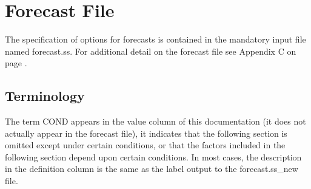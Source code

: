 \section{Forecast File}
The specification of options for forecasts is contained in the mandatory input file named forecast.ss.  For additional detail on the forecast file see Appendix C on page \pageref{sec:forecast}.


\subsection{Terminology}
The term COND appears in the value column of this documentation (it does not actually appear in the forecast file), it indicates that the following section is omitted except under certain conditions, or that the factors included in the following section depend upon certain conditions. In most cases, the description in the definition column is the same as the label output to the forecast.ss\_new file.

